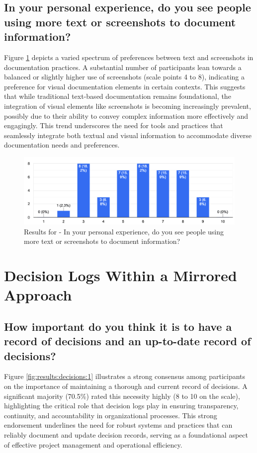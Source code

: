 \pagebreak

\subsection*{In your personal experience, do you see people using more text or screenshots to document information?}
Figure \ref{fig:results:highlighting:5} depicts a varied spectrum of preferences between text and screenshots in documentation practices. A substantial number of participants lean towards a balanced or slightly higher use of screenshots (scale points 4 to 8), indicating a preference for visual documentation elements in certain contexts. This suggests that while traditional text-based documentation remains foundational, the integration of visual elements like screenshots is becoming increasingly prevalent, possibly due to their ability to convey complex information more effectively and engagingly. This trend underscores the need for tools and practices that seamlessly integrate both textual and visual information to accommodate diverse documentation needs and preferences.

\begin{figure}[h!]
\centering
\includegraphics[width=\linewidth]{Images/Survey/documents_5.png}
\caption{Results for - In your personal experience, do you see people using more text or screenshots to document information?}
\label{fig:results:highlighting:5}
\end{figure}

\pagebreak

\section{Decision Logs Within a Mirrored Approach}

\subsection*{How important do you think it is to have a record of decisions and an up-to-date record of decisions?}
Figure \ref{fig:results:decisions:1} illustrates a strong consensus among participants on the importance of maintaining a thorough and current record of decisions. A significant majority (70.5\%) rated this necessity highly (8 to 10 on the scale), highlighting the critical role that decision logs play in ensuring transparency, continuity, and accountability in organizational processes. This strong endorsement underlines the need for robust systems and practices that can reliably document and update decision records, serving as a foundational aspect of effective project management and operational efficiency.

